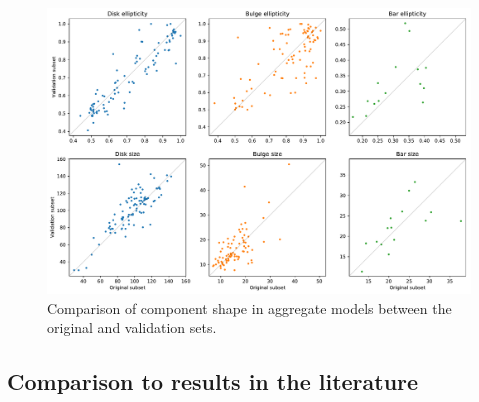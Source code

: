 \documentclass[../main.tex]{subfiles}
\begin{document}
\begin{figure}
  \includegraphics[width=17.3cm]{images__results/component_sizing.pdf}
  \caption{Comparison of component shape in aggregate models between the original and validation sets.}
  \label{fig:aggregate_model_consistency}
\end{figure}


\subsection{Comparison to results in the literature}
\end{document}
